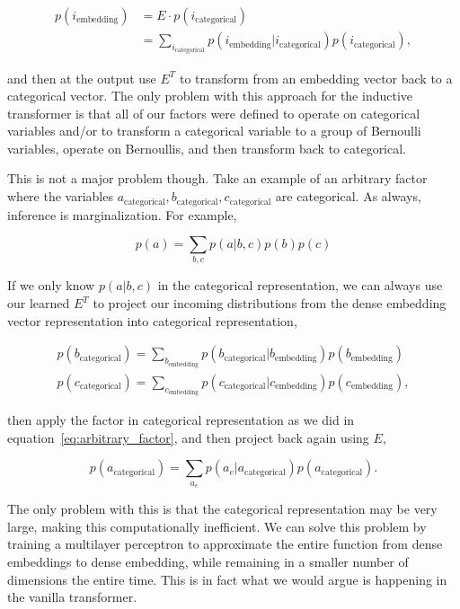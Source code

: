 \documentclass{article}
\begin{document}
\begin{align}
    p(i_{\text{embedding}}) 
    &= E \cdot p(i_{\text{categorical}}) \\
    &= \sum_{i_{\text{categorical}}} p(i_{\text{embedding}}|i_{\text{categorical}})
    p(i_{\text{categorical}}),
\end{align}

and then at the output use $E^T$ to transform from an embedding vector back to a categorical vector.  The only problem with this approach for the inductive transformer is that all of our factors were defined to operate on categorical variables and/or to transform a categorical variable to a group of Bernoulli variables, operate on Bernoullis, and then transform back to categorical.

This is not a major problem though. Take an example of an arbitrary factor where the variables $a_{\text{categorical}}, b_{\text{categorical}}, c_{\text{categorical}}$ are categorical. As always, inference is marginalization. For example,

\begin{equation}\label{eq:arbitrary_factor}
    p(a) = \sum_{b,c} p(a|b,c)p(b)p(c)
\end{equation}

If we only know $p(a|b,c)$ in the categorical representation, we can always use our learned $E^T$ to project our incoming distributions from the dense embedding vector representation into categorical representation, 

\begin{align}
    p(b_{\text{categorical}}) = \sum_{b_\text{embedding}} p(b_{\text{categorical}}|b_\text{embedding})p(b_\text{embedding}) \\
    p(c_{\text{categorical}}) = \sum_{c_\text{embedding}} p(c_{\text{categorical}}|c_\text{embedding})p(c_\text{embedding}),
\end{align}

then apply the factor in categorical representation as we did in equation~\ref{eq:arbitrary_factor}, and then project back again using $E$,

\begin{equation}
    p(a_{\text{categorical}}) = \sum_{a_e} p(a_e|a_{\text{categorical}})p(a_{\text{categorical}}).
\end{equation}

The only problem with this is that the categorical representation may be very large, making this computationally inefficient.  We can solve this problem by training a multilayer perceptron to approximate the entire function from dense embeddings to dense embedding, while remaining in a smaller number of dimensions the entire time. This is in fact what we would argue is happening in the vanilla transformer.  
\end{document}
